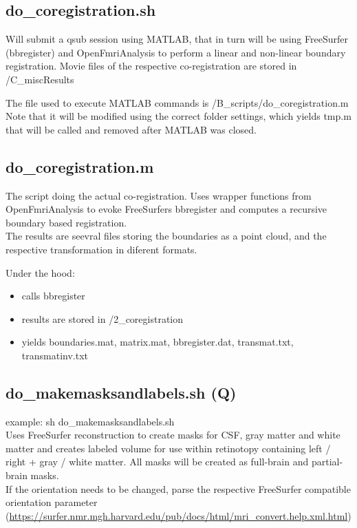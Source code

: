 \documentclass[12pt,a4paper]{scrartcl}
\begin{document}
\subsection{do\_coregistration.sh}
\label{sec:coreg}
Will submit a qsub session using MATLAB, that in turn will be using FreeSurfer (bbregister) and OpenFmriAnalysis to perform a linear and non-linear boundary registration.  Movie files of the respective co-registration are stored in /C\_miscResults

\noindent The file used to execute MATLAB commands is /B\_scripts/do\_coregistration.m Note that it will be modified using the correct folder settings, which yields tmp.m that will be called and removed after MATLAB was closed.\\

\subsection{do\_coregistration.m}
The script doing the actual co-registration. Uses wrapper functions from OpenFmriAnalysis to evoke FreeSurfers bbregister and computes a recursive boundary based registration.\\

\noindent The results are seevral files storing the boundaries as a point cloud, and the respective transformation in diferent formats.

\noindent Under the hood:
\begin{itemize}
\item calls bbregister
\item results are stored in /2\_coregistration
\item yields boundaries.mat, matrix.mat, bbregister.dat, transmat.txt, transmatinv.txt
\end{itemize}

\subsection{do\_makemasksandlabels.sh (Q)}
\label{sec:msklbl}
example: sh do\_makemasksandlabels.sh\\

\noindent Uses FreeSurfer reconstruction to create masks for CSF, gray matter and white matter and creates labeled volume for use within retinotopy containing left / right + gray / white matter. All masks will be created as full-brain and partial-brain masks.\\

\noindent If the orientation needs to be changed, parse the respective FreeSurfer compatible orientation parameter (\href{https://surfer.nmr.mgh.harvard.edu/pub/docs/html/mri_convert.help.xml.html}{https://surfer.nmr.mgh.harvard.edu/pub/docs/html/mri\_convert.help.xml.html})\\
\end{document}
